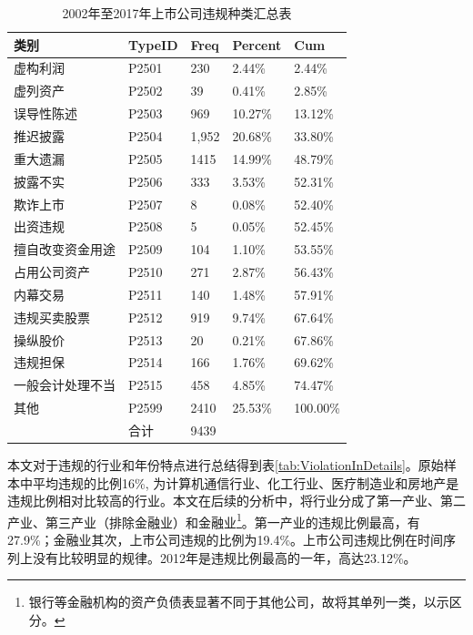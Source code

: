 \documentclass{article}
\begin{document}
\begin{table}[H]
  \centering
  \kaishu
  \caption{2002年至2017年上市公司违规种类汇总表}
    \begin{tabular}{lllll} \hline\hline
    \multicolumn{1}{l}{类别} & TypeID & \multicolumn{1}{p{4.13em}}{Freq} & \multicolumn{1}{l}{Percent} & \multicolumn{1}{l}{Cum} \\ \hline
    \multicolumn{1}{l}{虚构利润} & P2501 & 230   & 2.44\% & 2.44\% \\
    \multicolumn{1}{l}{虚列资产} & P2502 & 39    & 0.41\% & 2.85\% \\
    \multicolumn{1}{l}{误导性陈述} & P2503 & 969   & 10.27\% & 13.12\% \\
    \multicolumn{1}{l}{推迟披露} & P2504 & 1,952 & 20.68\% & 33.80\% \\
    \multicolumn{1}{l}{重大遗漏} & P2505 & 1415  & 14.99\% & 48.79\% \\
    \multicolumn{1}{l}{披露不实} & P2506 & 333   & 3.53\% & 52.31\% \\
    \multicolumn{1}{l}{欺诈上市} & P2507 & 8     & 0.08\% & 52.40\% \\
    \multicolumn{1}{l}{出资违规} & P2508 & 5     & 0.05\% & 52.45\% \\
    \multicolumn{1}{l}{擅自改变资金用途} & P2509 & 104   & 1.10\% & 53.55\% \\
    \multicolumn{1}{l}{占用公司资产} & P2510 & 271   & 2.87\% & 56.43\% \\
    \multicolumn{1}{l}{内幕交易} & P2511 & 140   & 1.48\% & 57.91\% \\
    \multicolumn{1}{l}{违规买卖股票} & P2512 & 919   & 9.74\% & 67.64\% \\
    \multicolumn{1}{l}{操纵股价} & P2513 & 20    & 0.21\% & 67.86\% \\
    \multicolumn{1}{l}{违规担保} & P2514 & 166   & 1.76\% & 69.62\% \\
    \multicolumn{1}{l}{一般会计处理不当} & P2515 & 458   & 4.85\% & 74.47\% \\
    \multicolumn{1}{l}{其他} & P2599 & 2410  & 25.53\% & 100.00\% \\ \hline
          & 合计   & 9439  &       &  \\ \hline\hline
    \end{tabular}%
  \label{tab:sumofmiss}%
\end{table}
\par 本文对于违规的行业和年份特点进行总结得到表\ref{tab:ViolationInDetails}。原始样本中平均违规的比例16\%, 为计算机通信行业、化工行业、医疗制造业和房地产是违规比例相对比较高的行业。本文在后续的分析中，将行业分成了第一产业、第二产业、第三产业（排除金融业）和金融业\footnote{银行等金融机构的资产负债表显著不同于其他公司，故将其单列一类，以示区分。}。第一产业的违规比例最高，有27.9\%；金融业其次，上市公司违规的比例为19.4\%。上市公司违规比例在时间序列上没有比较明显的规律。2012年是违规比例最高的一年，高达23.12\%。
\end{document}
